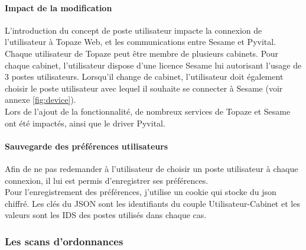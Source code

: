 \paragraph*{Impact de la modification\\}
L'introduction du concept de poste utilisateur impacte la connexion de l'utilisateur à Topaze Web, et les communications entre Sesame et Pyvital.\\
Chaque utilisateur de Topaze peut être membre de plusieurs cabinets. Pour chaque cabinet, l'utilisateur dispose d'une licence Sesame lui autorisant l'usage de 3 postes utilisateurs. Lorsqu'il change de cabinet, l'utilisateur doit également choisir le poste utilisateur avec lequel il souhaite se connecter à Sesame (voir annexe \ref{fig:device}).\\

Lors de l'ajout de la fonctionnalité, de nombreux services de Topaze et Sesame ont été impactés, ainsi que le driver Pyvital.

\paragraph*{Sauvegarde des préférences utilisateurs\\}
Afin de ne pas redemander à l'utilisateur de choisir un poste utilisateur à chaque connexion, il lui est permis d'enregistrer ses préférences.\\
Pour l'enregistrement des préférences, j'utilise un cookie qui stocke du json chiffré. Les clés du JSON sont les identifiants du couple Utilisateur-Cabinet et les valeurs sont les IDS des postes utilisés dans chaque cas.






\subsubsection{Les scans d'ordonnances}
